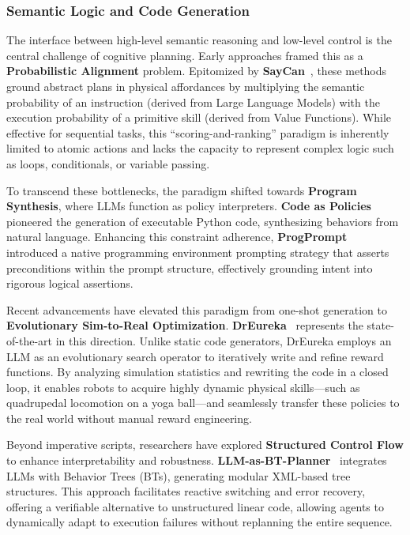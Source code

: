 \documentclass[acmsmall,screen,review,anonymous]{acmart}
\begin{document}
\subsubsection{Semantic Logic and Code Generation}\label{sec:code_gen}

The interface between high-level semantic reasoning and low-level control is the central challenge of cognitive planning. Early approaches framed this as a \textbf{Probabilistic Alignment} problem. Epitomized by \textbf{SayCan}~\cite{brohan2023can}, these methods ground abstract plans in physical affordances by multiplying the semantic probability of an instruction (derived from Large Language Models) with the execution probability of a primitive skill (derived from Value Functions). While effective for sequential tasks, this ``scoring-and-ranking'' paradigm is inherently limited to atomic actions and lacks the capacity to represent complex logic such as loops, conditionals, or variable passing.

To transcend these bottlenecks, the paradigm shifted towards \textbf{Program Synthesis}, where LLMs function as policy interpreters. 
\textbf{Code as Policies}~\cite{liang2022code} pioneered the generation of executable Python code, synthesizing behaviors from natural language. 
Enhancing this constraint adherence, \textbf{ProgPrompt}~\cite{singh2022progprompt} introduced a native programming environment prompting strategy that asserts preconditions within the prompt structure, effectively grounding intent into rigorous logical assertions.

Recent advancements have elevated this paradigm from one-shot generation to \textbf{Evolutionary Sim-to-Real Optimization}. \textbf{DrEureka}~\cite{dreureka2024} represents the state-of-the-art in this direction. Unlike static code generators, DrEureka employs an LLM as an evolutionary search operator to iteratively write and refine reward functions. By analyzing simulation statistics and rewriting the code in a closed loop, it enables robots to acquire highly dynamic physical skills—such as quadrupedal locomotion on a yoga ball—and seamlessly transfer these policies to the real world without manual reward engineering.

Beyond imperative scripts, researchers have explored \textbf{Structured Control Flow} to enhance interpretability and robustness. \textbf{LLM-as-BT-Planner}~\cite{ao2025llmbt} integrates LLMs with Behavior Trees (BTs), generating modular XML-based tree structures. This approach facilitates reactive switching and error recovery, offering a verifiable alternative to unstructured linear code, allowing agents to dynamically adapt to execution failures without replanning the entire sequence.
\end{document}
